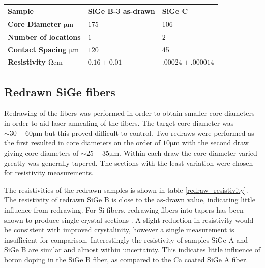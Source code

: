 \begin{table}[!h]
\begin{center}
\begin{tabular}{ | l | l | l | }
\hline
\textbf{Sample}& SiGe B-3 as-drawn & SiGe C\\ \hline
\textbf{Core Diameter $\si{\micro \meter}$}& $ 175$ & 106\\\hline
\textbf{Number of locations}&$1$ & $2$ \\\hline
\textbf{Contact Spacing $\si{\micro\meter}$}&$120$ & 45\\ \hline
\textbf{Resistivity $\si{\ohm \cm}$}& $0.16 \pm 0.01$ & $.00024 \pm .000014$\\\hline
\end{tabular}
\end{center}
\caption{}
\label{Tabmb25}
\end{table}

\FloatBarrier
\subsection{Redrawn SiGe fibers}
Redrawing of the fibers was performed in order to obtain smaller core diameters in order to aid laser annealing of the fibers. The target core diameter was $\sim 30 - 60 \si{\micro\meter}$ but this proved difficult to control. Two redraws were performed as the first resulted in core diameters on the order of  $ 10  \si{\micro\meter}$ with the second draw giving core diameters of $\sim 25-35 \si{\micro\meter}$. Within each draw the core diameter varied greatly was generally tapered. The sections with the least variation were chosen for resistivity measurements.

The resistivities of the redrawn samples is shown in table \ref{redraw_resistivity}.  The resistivity of redrawn SiGe B is close to the as-drawn value, indicating little influence from redrawing. For Si fibers, redrawing fibers into tapers has been shown to produce single crystal sections \cite{??}. A slight reduction in resistivity would be consistent with improved crystalinity, however a single measurement is insufficient for comparison.  Interestingly the resistivity of samples SiGe A and SiGe B are similar and almost within uncertainty. This indicates little influence of boron doping in the SiGe B fiber, as compared to the Ca coated SiGe A fiber.  

